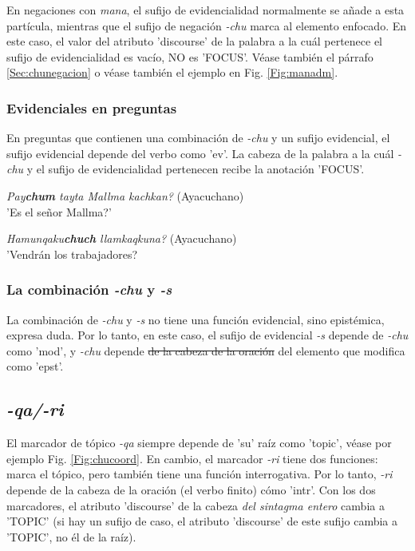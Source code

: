 \documentclass[a4paper,11pt,DIV12]{scrartcl}
\begin{document}
En negaciones con {\em mana}, el sufijo de evidencialidad normalmente se a\~nade a esta part\'icula, mientras que el sufijo de negaci\'on {\em -chu} marca al elemento enfocado. En este caso, el valor del atributo 'discourse' de la palabra a la cu\'al pertenece el sufijo de evidencialidad es vac\'io, NO es 'FOCUS'. V\'ease tambi\'en el p\'arrafo \ref{Sec:chunegacion} o v\'ease tambi\'en el ejemplo en Fig. \ref{Fig:manadm}.

\subsubsection{Evidenciales en preguntas}
En preguntas que contienen una combinaci\'on de {\em -chu} y un sufijo evidencial, el sufijo evidencial depende del verbo como 'ev'. La cabeza de la palabra a la cu\'al {\em -chu} y el sufijo de evidencialidad pertenecen recibe la anotaci\'on 'FOCUS'.

\begin{examples}
 \item {\em Pay\textbf{chum} tayta Mallma kachkan?} (Ayacuchano)\\
      '{\textquestiondown}Es el se\~nor Mallma?'
 \item {\em Hamunqaku\textbf{chuch} llamkaqkuna?} (Ayacuchano)\\
      '{\textquestiondown}Vendr\'an los trabajadores?\\
    		\hfill{\small \citep[120]{Soto76a}}
\end{examples}

\subsubsection{La combinaci\'on {\em -chu} y {\em -s}}\label{Sec:chus}
La combinaci\'on de {\em -chu} y {\em -s} no tiene una funci\'on evidencial, sino epist\'emica, expresa duda. Por lo tanto, en este caso, el sufijo de evidencial {\em -s} depende de {\em -chu} como 'mod', y {\em -chu} depende \sout{de la cabeza de la oraci\'on} del elemento que modifica como 'epst'.

   \subsection{{\em-qa/-ri}}
El marcador de t\'opico {\em -qa} siempre depende de 'su' ra\'iz como 'topic', v\'ease por ejemplo Fig. \ref{Fig:chucoord}.
En cambio, el marcador {\em -ri} tiene dos funciones: marca el t\'opico, pero tambi\'en tiene una funci\'on interrogativa. Por lo tanto, {\em -ri} depende de la cabeza de la oraci\'on (el verbo finito) c\'omo 'intr'.
Con los dos marcadores, el atributo 'discourse' de la cabeza {\em del sintagma entero} cambia a 'TOPIC' (si hay un sufijo de caso, el atributo 'discourse' de este sufijo cambia a 'TOPIC', no \'el de la ra\'iz). 
\end{document}

